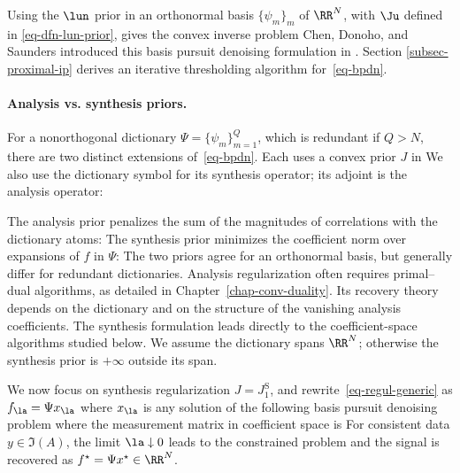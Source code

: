 Using the $\lun$ prior in an orthonormal basis $\{\psi_m\}_m$ of $\RR^N$, with $\Ju$ defined in \eqref{eq-dfn-lun-prior}, gives the convex inverse problem
Chen, Donoho, and Saunders introduced this basis pursuit denoising formulation in \cite{chen-basis-pursuit}. Section \ref{subsec-proximal-ip} derives an iterative thresholding algorithm for~\eqref{eq-bpdn}.

\paragraph{Analysis vs. synthesis priors.}

For a nonorthogonal dictionary $\Psi=\{\psi_m\}_{m=1}^Q$, which is redundant if $Q>N$, there are two distinct extensions of~\eqref{eq-bpdn}. Each uses a convex prior $J$ in
We also use the dictionary symbol for its synthesis operator; its adjoint is the analysis operator:

The analysis prior penalizes the sum of the magnitudes of correlations with the dictionary atoms:
The synthesis prior minimizes the coefficient norm over expansions of $f$ in $\Psi$:
The two priors agree for an orthonormal basis, but generally differ for redundant dictionaries. Analysis regularization often requires primal--dual algorithms, as detailed in Chapter~\ref{chap-conv-duality}. Its recovery theory depends on the dictionary and on the structure of the vanishing analysis coefficients. The synthesis formulation leads directly to the coefficient-space algorithms studied below. We assume the dictionary spans $\RR^N$; otherwise the synthesis prior is $+\infty$ outside its span.

We now focus on synthesis regularization $J=J_1^{\text{S}}$, and rewrite~\eqref{eq-regul-generic} as $f_\la = \Psi x_\la$ where $x_\la$ is any solution of the following basis pursuit denoising problem
where the measurement matrix in coefficient space is
For consistent data $y\in\Im(A)$, the limit $\la\downarrow0$ leads to the constrained problem
and the signal is recovered as $f^\star=\Psi x^\star \in \RR^N$.



